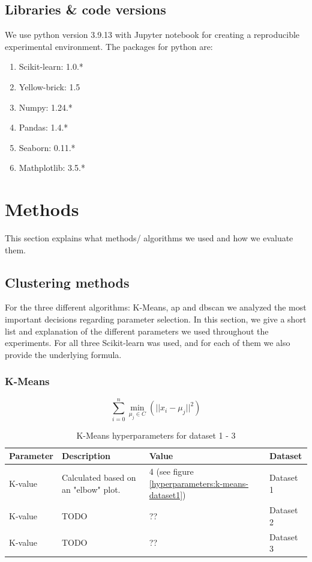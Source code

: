 \subsection{Libraries \& code versions}
We use python version 3.9.13 with Jupyter notebook for creating a reproducible experimental environment.
The packages for python are:
\begin{enumerate}
  \item Scikit-learn: 1.0.*
  \item Yellow-brick: 1.5
  \item Numpy: 1.24.*
  \item Pandas: 1.4.*
  \item Seaborn: 0.11.*
  \item Mathplotlib: 3.5.*
\end{enumerate}

\section{Methods}
This section explains what methods/ algorithms we used and how we evaluate them.
\subsection{Clustering methods}
For the three different algorithms: K-Means, \gls{ap} and \gls{dbscan} we analyzed the most important decisions regarding parameter selection.
In this section, we give a short list and explanation of the different parameters we used throughout the experiments.
For all three Scikit-learn was used, and for each of them we also provide the underlying formula.
\subsubsection{K-Means}
\begin{equation}
  \sum_{i=0}^{n}\min_{\mu_j \in C}(||x_i - \mu_j||^2)
\end{equation}
\begin{table}[h]
  \begin{tabular}{|l|p{6cm}|l|l|}
    \hline
    Parameter & Description                          & Value                                                 & Dataset   \\ \hline
    K-value   & Calculated based on an "elbow" plot. & 4 (see figure \ref{hyperparameters:k-means-dataset1}) & Dataset 1 \\ \hline
    K-value   & TODO                                 & ??                                                    & Dataset 2 \\ \hline
    K-value   & TODO                                 & ??                                                    & Dataset 3 \\


    \hline
  \end{tabular}
  \caption{K-Means hyperparameters for dataset 1 - 3}
  \label{tab:kmeans-formula-dataset-2}
\end{table}

